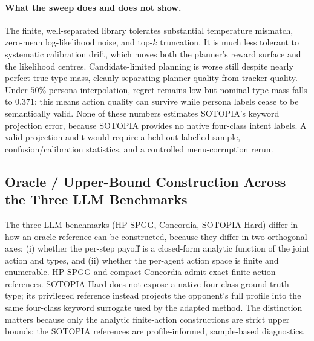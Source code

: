 \paragraph{What the sweep does and does not show.} The finite, well-separated library tolerates substantial temperature mismatch, zero-mean log-likelihood noise, and top-$k$ truncation. It is much less tolerant to systematic calibration drift, which moves both the planner's reward surface and the likelihood centres. Candidate-limited planning is worse still despite nearly perfect true-type mass, cleanly separating planner quality from tracker quality. Under $50\%$ persona interpolation, regret remains low but nominal type mass falls to $0.371$; this means action quality can survive while persona labels cease to be semantically valid. None of these numbers estimates SOTOPIA's keyword projection error, because SOTOPIA provides no native four-class intent labels. A valid projection audit would require a held-out labelled sample, confusion/calibration statistics, and a controlled menu-corruption rerun.

\subsection{Oracle / Upper-Bound Construction Across the Three LLM Benchmarks}
\label{app:oracle-construction}

The three LLM benchmarks (HP-SPGG, Concordia, SOTOPIA-Hard) differ in how an oracle reference can be constructed, because they differ in two orthogonal axes: (i) whether the per-step payoff is a closed-form analytic function of the joint action and types, and (ii) whether the per-agent action space is finite and enumerable. HP-SPGG and compact Concordia admit exact finite-action references. SOTOPIA-Hard does not expose a native four-class ground-truth type; its privileged reference instead projects the opponent's full profile into the same four-class keyword surrogate used by the adapted method. The distinction matters because only the analytic finite-action constructions are strict upper bounds; the SOTOPIA references are profile-informed, sample-based diagnostics.

